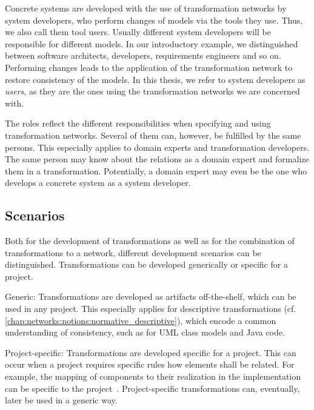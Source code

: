 Concrete systems are developed with the use of transformation networks by system developers, who perform changes of models via the tools they use.
Thus, we also call them tool users.
Usually different system developers will be responsible for different models.
In our introductory example, we distinguished between software architects, developers, requirements engineers and so on.
Performing changes leads to the application of the transformation network to restore consistency of the models.
In this thesis, we refer to system developers as \emph{users}, as they are the ones using the transformation networks we are concerned with.

The roles reflect the different responsibilities when specifying and using transformation networks.
Several of them can, however, be fulfilled by the same persons.
This especially applies to domain experts and transformation developers.
The same person may know about the relations as a domain expert and formalize them in a transformation.
Potentially, a domain expert may even be the one who develops a concrete system as a system developer.


\subsection{Scenarios}

Both for the development of transformations as well as for the combination of transformations to a network, different development scenarios can be distinguished.
Transformations can be developed generically or specific for a project.
\begin{properdescription}
    \item[Generic:] Transformations are developed as artifacts off-the-shelf, which can be used in any project. This especially applies for descriptive transformations (cf. \autoref{chap:networks:notions:normative_descriptive}), which encode a common understanding of consistency, such as for \gls{UML} class models and Java code.
    \item[Project-specific:] Transformations are developed specific for a project. This can occur when a project requires specific rules how elements shall be related. For example, the mapping of components to their realization in the implementation can be specific to the project~\cite{langhammer2017a}. Project-specific transformations can, eventually, later be used in a generic way.
\end{properdescription}

